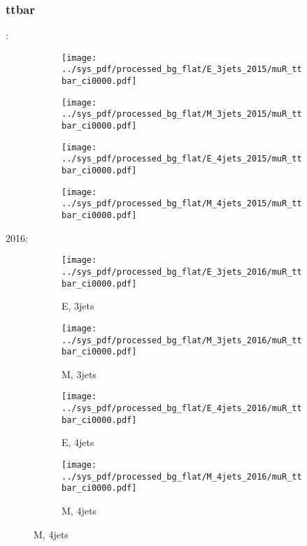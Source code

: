 \documentclass{beamer}
\begin{document}
\begin{frame}
\frametitle{ttbar}
\fontsize{5}{1}:
\begin{figure}
\centering
\begin{subfigure}[b]{0.24\textwidth}
\texttt{[image: ../sys\_pdf/processed\_bg\_flat/E\_3jets\_2015/muR\_ttbar\_ci0000.pdf]}
\end{subfigure}
\begin{subfigure}[b]{0.24\textwidth}
\texttt{[image: ../sys\_pdf/processed\_bg\_flat/M\_3jets\_2015/muR\_ttbar\_ci0000.pdf]}
\end{subfigure}
\begin{subfigure}[b]{0.24\textwidth}
\texttt{[image: ../sys\_pdf/processed\_bg\_flat/E\_4jets\_2015/muR\_ttbar\_ci0000.pdf]}
\end{subfigure}
\begin{subfigure}[b]{0.24\textwidth}
\texttt{[image: ../sys\_pdf/processed\_bg\_flat/M\_4jets\_2015/muR\_ttbar\_ci0000.pdf]}
\end{subfigure}
\end{figure}
2016:
\begin{figure}
\centering
\begin{subfigure}[b]{0.24\textwidth}
\texttt{[image: ../sys\_pdf/processed\_bg\_flat/E\_3jets\_2016/muR\_ttbar\_ci0000.pdf]}
\captionsetup{font=tiny}
\caption{E, 3jets}
\end{subfigure}
\begin{subfigure}[b]{0.24\textwidth}
\texttt{[image: ../sys\_pdf/processed\_bg\_flat/M\_3jets\_2016/muR\_ttbar\_ci0000.pdf]}
\captionsetup{font=tiny}
\caption{M, 3jets}
\end{subfigure}
\begin{subfigure}[b]{0.24\textwidth}
\texttt{[image: ../sys\_pdf/processed\_bg\_flat/E\_4jets\_2016/muR\_ttbar\_ci0000.pdf]}
\captionsetup{font=tiny}
\caption{E, 4jets}
\end{subfigure}
\begin{subfigure}[b]{0.24\textwidth}
\texttt{[image: ../sys\_pdf/processed\_bg\_flat/M\_4jets\_2016/muR\_ttbar\_ci0000.pdf]}
\captionsetup{font=tiny}
\caption{M, 4jets}
\end{subfigure}
\end{figure}
\end{frame}
\end{document}
